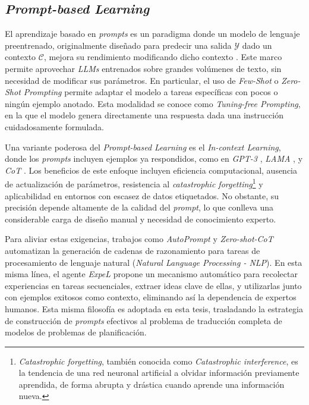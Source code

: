 \subsection{\textit{Prompt-based Learning}}

El aprendizaje basado en \textit{prompts} es un paradigma donde un modelo de lenguaje preentrenado, originalmente diseñado para predecir una salida $\mathcal{Y}$ dado un contexto $\mathcal{C}$, mejora su rendimiento modificando dicho contexto \parencite{liu2023pre}. Este marco permite aprovechar \textit{LLMs} entrenados sobre grandes volúmenes de texto, sin necesidad de modificar sus parámetros. En particular, el uso de \textit{Few-Shot} o \textit{Zero-Shot Prompting} permite adaptar el modelo a tareas específicas con pocos o ningún ejemplo anotado. Esta modalidad se conoce como \textit{Tuning-free Prompting}, en la que el modelo genera directamente una respuesta dada una instrucción cuidadosamente formulada.

Una variante poderosa del \textit{Prompt-based Learning} es el \textit{In-context Learning}, donde los \textit{prompts} incluyen ejemplos ya respondidos, como en \textit{GPT-3} \parencite{brown2020language}, \textit{LAMA} \parencite{petroni2019language}, y \textit{CoT} \parencite{wei2022chain}. Los beneficios de este enfoque incluyen eficiencia computacional, ausencia de actualización de parámetros, resistencia al \textit{catastrophic forgetting}\footnote{\textit{Catastrophic forgetting}, también conocida como \textit{Catastrophic interference}, es la tendencia de una red neuronal artificial a olvidar información previamente aprendida, de forma abrupta y drástica cuando aprende una información nueva.} y aplicabilidad en entornos con escasez de datos etiquetados. No obstante, su precisión depende altamente de la calidad del \textit{prompt}, lo que conlleva una considerable carga de diseño manual y necesidad de conocimiento experto.

Para aliviar estas exigencias, trabajos como \textit{AutoPrompt} y \textit{Zero-shot-CoT} \parencite{kojima2022large, zhang2022automatic} automatizan la generación de cadenas de razonamiento para tareas de procesamiento de lenguaje natural (\textit{Natural Language Processing - NLP}). En esta misma línea, el agente \textit{ExpeL} propone un mecanismo automático para recolectar experiencias en tareas secuenciales, extraer ideas clave de ellas, y utilizarlas junto con ejemplos exitosos como contexto, eliminando así la dependencia de expertos humanos. Esta misma filosofía es adoptada en esta tesis, trasladando la estrategia de construcción de \textit{prompts} efectivos al problema de traducción completa de modelos de problemas de planificación.

